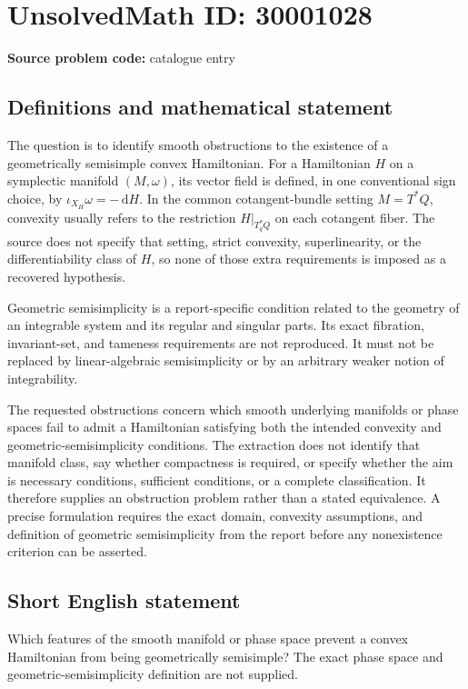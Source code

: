 \documentclass[11pt]{article}
\newcommand{\dd}{\,\mathrm{d}}
\begin{document}
\section*{UnsolvedMath ID: 30001028}
\textbf{Source problem code:} catalogue entry
\subsection{Definitions and mathematical statement}
The question is to identify smooth obstructions to the existence of a geometrically semisimple convex Hamiltonian. For a Hamiltonian \(H\) on a symplectic manifold \((M,\omega)\), its vector field is defined, in one conventional sign choice, by \(\iota_{X_H}\omega=-\dd H\). In the common cotangent-bundle setting \(M=T^*Q\), convexity usually refers to the restriction \(H|_{T_q^*Q}\) on each cotangent fiber. The source does not specify that setting, strict convexity, superlinearity, or the differentiability class of \(H\), so none of those extra requirements is imposed as a recovered hypothesis.

Geometric semisimplicity is a report-specific condition related to the geometry of an integrable system and its regular and singular parts. Its exact fibration, invariant-set, and tameness requirements are not reproduced. It must not be replaced by linear-algebraic semisimplicity or by an arbitrary weaker notion of integrability.

The requested obstructions concern which smooth underlying manifolds or phase spaces fail to admit a Hamiltonian satisfying both the intended convexity and geometric-semisimplicity conditions. The extraction does not identify that manifold class, say whether compactness is required, or specify whether the aim is necessary conditions, sufficient conditions, or a complete classification. It therefore supplies an obstruction problem rather than a stated equivalence. A precise formulation requires the exact domain, convexity assumptions, and definition of geometric semisimplicity from the report before any nonexistence criterion can be asserted.
\subsection{Short English statement}
Which features of the smooth manifold or phase space prevent a convex Hamiltonian from being geometrically semisimple? The exact phase space and geometric-semisimplicity definition are not supplied.
\end{document}
